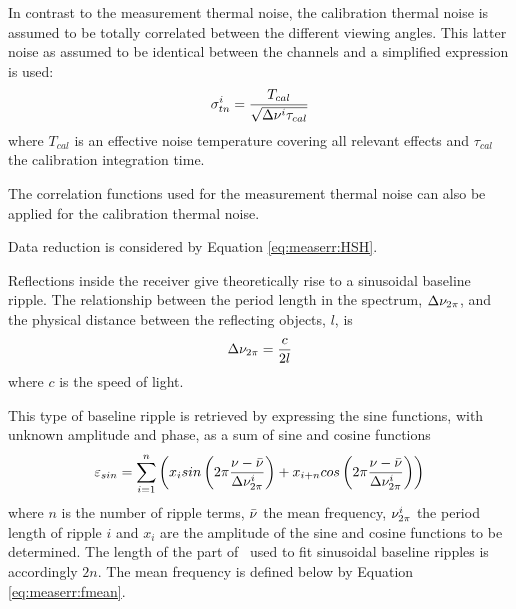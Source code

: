  \label{sec:measerr:ctn}
 
 In contrast to the measurement thermal noise, the calibration thermal
 noise is assumed to be totally correlated between the different
 viewing angles. This latter noise as assumed to be identical between the
 channels and a simplified expression is used:
 \begin{equation}
   \sigma_{tn}^i = \frac{T_{cal}}{\sqrt{\Delta \nu^i \tau_{cal}}}
  \label{eq:measerr:tn2}
 \end{equation}
 where $T_{cal}$ is an effective noise temperature covering all relevant
 effects and $\tau_{cal}$ the calibration integration time.

 The correlation functions used for the measurement thermal noise can
 also be applied for the calibration thermal noise.  
 
 Data reduction is considered by Equation \ref{eq:measerr:HSH}.
 


 \label{sec:measerr:sin}
 
 Reflections inside the receiver give theoretically rise to a
 sinusoidal baseline ripple. The relationship between the period
 length in the spectrum, $\Delta \nu_{2\pi}$, and the physical distance
 between the reflecting objects, $l$, is \citep{rohlfs:86} 
 \begin{equation}
   \Delta \nu_{2\pi} = \frac{c}{2l}
 \end{equation}
 where $c$ is the speed of light.
 
 This type of baseline ripple is retrieved by expressing the sine
 functions, with unknown amplitude and phase, as a sum of sine and
 cosine functions \citep{kuntz:97}
 \begin{equation}
   \varepsilon_{sin} = \sum_{i=1}^n \left( 
          x_i sin\left(2\pi\frac{\nu-\bar{\nu}}{\Delta \nu_{2\pi}^i}\right) +
          x_{i+n} cos\left(2\pi\frac{\nu-\bar{\nu}}{\Delta \nu_{2\pi}^i}\right) \right)
  \label{eq:measerr:sines}
 \end{equation}
 where $n$ is the number of ripple terms, $\bar{\nu}$ the mean
 frequency, $\nu_{2\pi}^i$ the period length of ripple $i$ and $x_i$
 are the amplitude of the sine and cosine functions to be determined.
 The length of the part of \xt\ used to fit sinusoidal baseline
 ripples is accordingly $2n$. The mean frequency is defined below by
 Equation \ref{eq:measerr:fmean}.
 
